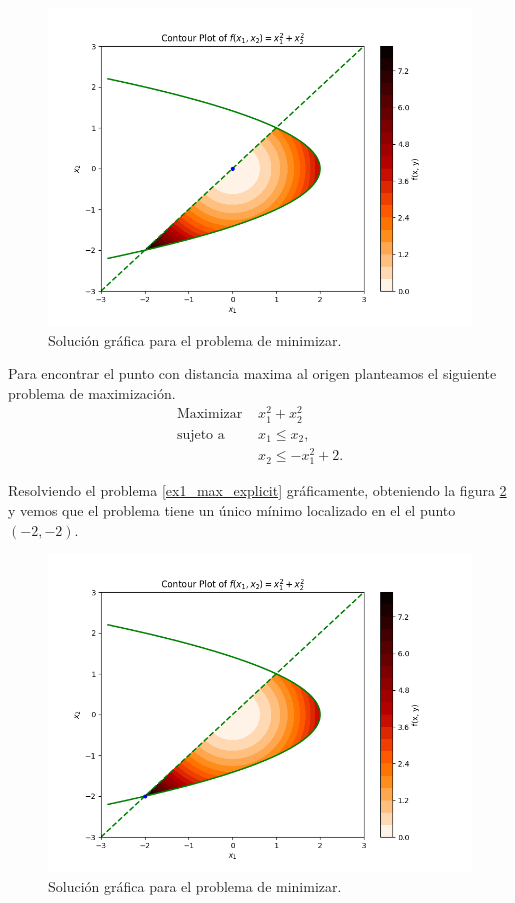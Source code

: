 \begin{figure}[h]
\centering
\includegraphics[scale=0.6]{ex1_min.png}
\caption{Solución gráfica para el problema de minimizar.}
\label{ex1_min}
\end{figure}

Para encontrar el punto con distancia maxima al origen planteamos el siguiente problema de maximización.
\begin{equation} \label{ex1_max_explicit}
\begin{aligned}
    \text{Maximizar }   & x_1^2 + x_2^2 \\
    \text{sujeto a }    & x_1 \leq x_2, \\
                        & x_2 \leq -x_1^2 + 2.
\end{aligned}
\end{equation}

Resolviendo el problema \ref{ex1_max_explicit} gráficamente,
obteniendo la figura \ref{ex1_max} 
y vemos que el problema tiene un único mínimo localizado en el el punto $(-2,-2)$.

\begin{figure}[h]
\centering
\includegraphics[scale=0.6]{ex1_max.png}
\caption{Solución gráfica para el problema de minimizar.}
\label{ex1_max}
\end{figure}
